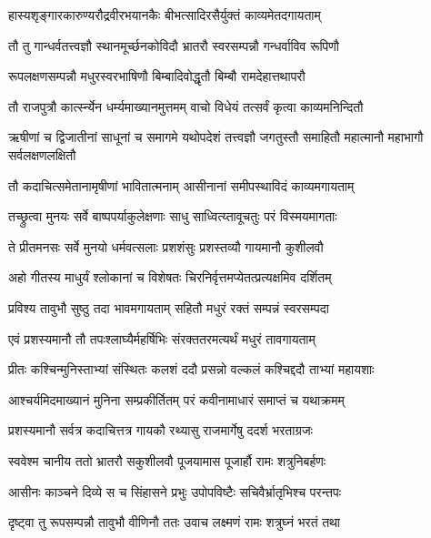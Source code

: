 \twolineshloka
{हास्यशृङ्गारकारुण्यरौद्रवीरभयानकैः}
{बीभत्सादिरसैर्युक्तं काव्यमेतदगायताम्} %

\twolineshloka
{तौ तु गान्धर्वतत्त्वज्ञौ स्थानमूर्च्छनकोविदौ}
{भ्रातरौ स्वरसम्पन्नौ गन्धर्वाविव रूपिणौ} %

\twolineshloka
{रूपलक्षणसम्पन्नौ मधुरस्वरभाषिणौ}
{बिम्बादिवोद्धृतौ बिम्बौ रामदेहात्तथापरौ} %

\twolineshloka
{तौ राजपुत्रौ कार्त्स्न्येन धर्म्यमाख्यानमुत्तमम्}
{वाचो विधेयं तत्सर्वं कृत्वा काव्यमनिन्दितौ} %

\threelineshloka
{ऋषीणां च द्विजातीनां साधूनां च समागमे}
{यथोपदेशं तत्त्वज्ञौ जगतुस्तौ समाहितौ}
{महात्मानौ महाभागौ सर्वलक्षणलक्षितौ} %

\twolineshloka
{तौ कदाचित्समेतानामृषीणां भावितात्मनाम्}
{आसीनानां समीपस्थाविदं काव्यमगायताम्} %

\twolineshloka
{तच्छ्रुत्वा मुनयः सर्वे बाष्पपर्याकुलेक्षणाः}
{साधु साध्वित्य्तावूचतुः परं विस्मयमागताः} %

\twolineshloka
{ते प्रीतमनसः सर्वे मुनयो धर्मवत्सलाः}
{प्रशशंसुः प्रशस्तव्यौ गायमानौ कुशीलवौ} %

\twolineshloka
{अहो गीतस्य माधुर्यं श्लोकानां च विशेषतः}
{चिरनिर्वृत्तमप्येतत्प्रत्यक्षमिव दर्शितम्} %

\twolineshloka
{प्रविश्य तावुभौ सुष्ठु तदा भावमगायताम्}
{सहितौ मधुरं रक्तं सम्पन्नं स्वरसम्पदा} %

\twolineshloka
{एवं प्रशस्यमानौ तौ तपःश्लाघ्यैर्महर्षिभिः}
{संरक्ततरमत्यर्थं मधुरं तावगायताम्} %

\twolineshloka
{प्रीतः कश्चिन्मुनिस्ताभ्यां संस्थितः कलशं ददौ}
{प्रसन्नो वल्कलं कश्चिद्ददौ ताभ्यां महायशाः} %

\twolineshloka
{आश्चर्यमिदमाख्यानं मुनिना सम्प्रकीर्तितम्}
{परं कवीनामाधारं समाप्तं च यथाक्रमम्} %

\twolineshloka
{प्रशस्यमानौ सर्वत्र कदाचित्तत्र गायकौ}
{रथ्यासु राजमार्गेषु ददर्श भरताग्रजः} %

\twolineshloka
{स्ववेश्म चानीय ततो भ्रातरौ सकुशीलवौ}
{पूजयामास पूजार्हौ रामः शत्रुनिबर्हणः} %

\twolineshloka
{आसीनः काञ्चने दिव्ये स च सिंहासने प्रभुः}
{उपोपविष्टैः सचिवैर्भ्रातृभिश्च परन्तपः} %

\twolineshloka
{दृष्ट्वा तु रूपसम्पन्नौ तावुभौ वीणिनौ ततः}
{उवाच लक्ष्मणं रामः शत्रुघ्नं भरतं तथा} %

